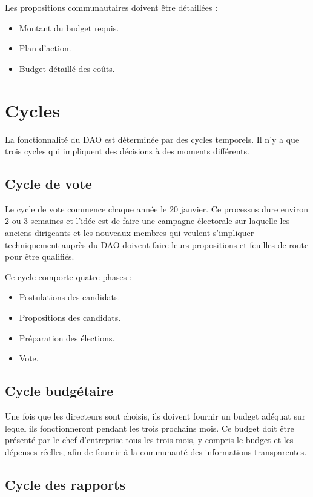 \documentclass{article}
\begin{document}
Les propositions communautaires doivent être détaillées :

\begin{itemize}
  \item Montant du budget requis.
  \item Plan d'action.
  \item Budget détaillé des coûts.
\end{itemize}

\section{Cycles}

La fonctionnalité du DAO est déterminée par des cycles temporels. Il n'y a que trois cycles qui impliquent des décisions à des moments différents.

\subsection{Cycle de vote}

Le cycle de vote commence chaque année le 20 janvier. Ce processus dure environ 2 ou 3 semaines et l'idée est de faire une campagne électorale sur laquelle les anciens dirigeants et les nouveaux membres qui veulent s'impliquer techniquement auprès du DAO doivent faire leurs propositions et feuilles de route pour être qualifiés.

Ce cycle comporte quatre phases :

\begin{itemize}
  \item Postulations des candidats.
  \item Propositions des candidats.
  \item Préparation des élections.
  \item Vote.
\end{itemize}

\subsection{Cycle budgétaire}

Une fois que les directeurs sont choisis, ils doivent fournir un budget adéquat sur lequel ils fonctionneront pendant les trois prochains mois. Ce budget doit être présenté par le chef d'entreprise tous les trois mois, y compris le budget et les dépenses réelles, afin de fournir à la communauté des informations transparentes.

\subsection{Cycle des rapports}
\end{document}
